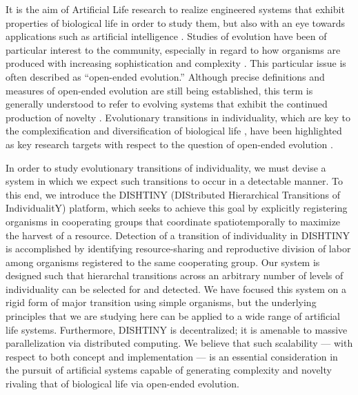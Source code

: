 It is the aim of Artificial Life research to realize engineered systems that exhibit properties of biological life in order to study them, but also with an eye towards applications such as artificial intelligence \citep{bedau2003artificial}.
Studies of evolution have been of particular interest to the community, especially in regard to how organisms are produced with increasing sophistication and complexity \citep{goldsby2017increasing}.
This particular issue is often described as ``open-ended evolution.''
Although precise definitions and measures of open-ended evolution are still being established, this term is generally understood to refer to evolving systems that exhibit the continued production of novelty \citep{taylor2016open}.
Evolutionary transitions in individuality, which are key to the complexification and diversification of biological life \citep{smith1997major}, have been highlighted as key research targets with respect to the question of open-ended evolution \citep{ray1996evolving, banzhaf2016defining}.

In order to study evolutionary transitions of individuality, we must devise a system in which we expect such transitions to occur in a detectable manner.
To this end, we introduce the DISHTINY (DIStributed Hierarchical Transitions of IndividualitY) platform, which seeks to achieve this goal by explicitly registering organisms in cooperating groups that coordinate spatiotemporally to maximize the harvest of a resource.
Detection of a transition of individuality in DISHTINY is accomplished by identifying resource-sharing and reproductive division of labor among organisms registered to the same cooperating group.
Our system is designed such that hierarchal transitions across an arbitrary number of levels of individuality can be selected for and detected.
We have focused this system on a rigid form of major transition using simple organisms, but the underlying principles that we are studying here can be applied to a wide range of artificial life systems.
Furthermore, DISHTINY is decentralized;
it is amenable to massive parallelization via distributed computing.
We believe that such scalability --- with respect to both concept and implementation --- is an essential consideration in the pursuit of artificial systems capable of generating complexity and novelty rivaling that of biological life via open-ended evolution.

